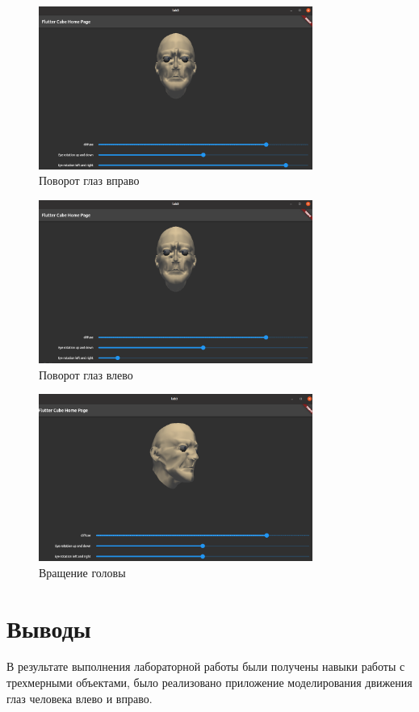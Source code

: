 \documentclass[a4paper, 14pt]{extarticle}
\begin{document}
\begin{figure}[!htb]
	\centering
	\includegraphics[width=0.8\textwidth]{img2}
\caption{Поворот глаз вправо}
\label{fig:img2}
\end{figure}

\begin{figure}[!htb]
	\centering
	\includegraphics[width=0.8\textwidth]{img3}
\caption{Поворот глаз влево}
\label{fig:img3}
\end{figure}

\begin{figure}[!htb]
	\centering
	\includegraphics[width=0.8\textwidth]{img4}
\caption{Вращение головы}
\label{fig:img4}
\end{figure}

\section{Выводы}\label{Sect::conclusion}

В результате выполнения лабораторной работы были получены навыки работы с трехмерными объектами, было реализовано приложение моделирования движения глаз человека влево и вправо.
\end{document}
